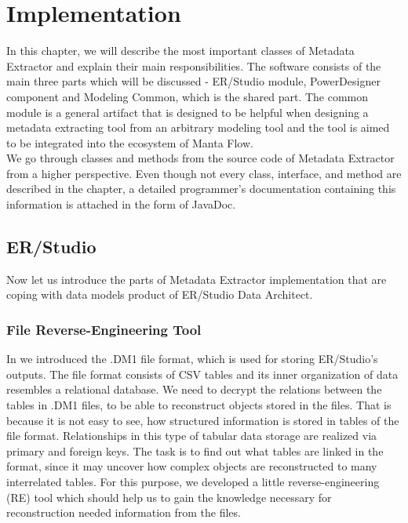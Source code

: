 \chapter{Implementation}
\label{implementation}

In this chapter, we will describe the most important classes of Metadata Extractor and explain their main responsibilities. The software consists of the main three parts which will be discussed - ER/Studio module, PowerDesigner component and Modeling Common, which is the shared part. 
The common module is a general artifact that is designed to be helpful when designing a metadata extracting tool from an arbitrary modeling tool and the tool is aimed to be integrated into the ecosystem of Manta Flow. \\

We go through classes and methods from the source code of Metadata Extractor from a higher perspective. 
Even though not every class, interface, and method are described in the chapter, a detailed programmer's documentation containing this information is attached in the form of JavaDoc.

\section{ER/Studio}

Now let us introduce the parts of Metadata Extractor implementation that are coping with data models product of ER/Studio Data Architect.

\subsection{File Reverse-Engineering Tool}
\label{subsec:dm1_tool}

In  we introduced the .DM1 file format, which is used for storing ER/Studio's outputs.
The file format consists of CSV tables and its inner organization of data resembles a relational database.
We need to decrypt the relations between the tables in .DM1 files, to be able to reconstruct objects stored in the files. That is because it is not easy to see, how structured information is stored in tables of the file format.
Relationships in this type of tabular data storage are realized via primary and foreign keys.
The task is to find out what tables are linked in the format, since it may uncover how complex objects are reconstructed to many interrelated tables.
For this purpose, we developed a little reverse-engineering (RE) tool which should help us to gain the knowledge necessary for reconstruction needed information from the files. \\

